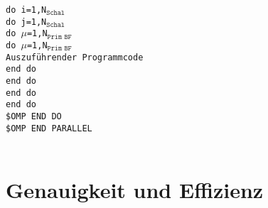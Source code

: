 \texttt{do i=1,N$_{\texttt{Schal}}$}\\ 
\null\quad\texttt{do j=1,N$_{\texttt{Schal}}$}\\ 
\null\quad\quad\texttt{do $\mu$=1,N$_{\texttt{Prim BF}}$}\\ 
\null\quad\quad\quad\texttt{do $\mu$=1,N$_{\texttt{Prim BF}}$}\\
\null\quad\quad\quad\quad \texttt{Auszuführender Programmcode}\\ 
\null\quad\quad\quad\texttt{end do}\\ 
\null\quad\quad\texttt{end do}\\ 
\null\quad\texttt{end do}\\ 
\texttt{end do}\\
\texttt{\$OMP END DO}\\
\texttt{\$OMP END PARALLEL}\\
\\


\section{Genauigkeit und Effizienz}\label{genauigkeit}